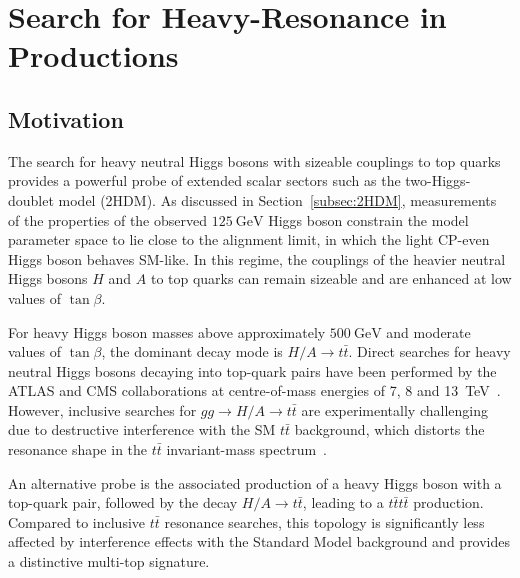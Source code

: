 ﻿%

\chapter{Search for Heavy-Resonance in \tttthead{} Productions}
\label{chap:BSMtttt}


\section{Motivation}

The search for heavy neutral Higgs bosons with sizeable couplings to
top quarks provides a powerful probe of extended scalar sectors
such as the two-Higgs-doublet model (2HDM). As discussed in
Section~\ref{subsec:2HDM}, measurements of the properties of the
observed $125~\mathrm{GeV}$ Higgs boson constrain the model parameter
space to lie close to the alignment limit, in which the light
CP-even Higgs boson behaves SM-like. In this regime, the couplings of
the heavier neutral Higgs bosons $H$ and $A$ to top quarks can remain
sizeable and are enhanced at low values of $\tan\beta$.

For heavy Higgs boson masses above approximately $500~\mathrm{GeV}$ and
moderate values of $\tan\beta$, the dominant decay mode is
$H/A \rightarrow t\bar{t}$. Direct searches for heavy neutral Higgs
bosons decaying into top-quark pairs have been performed by the ATLAS
and CMS collaborations at centre-of-mass energies of 7, 8 and
13~TeV~\cite{ATLAS:2017snw,CMS:2019pzc,ATLAS:2024vxm}. However, inclusive searches for $gg \to H/A \to t\bar{t}$ are
experimentally challenging due to destructive interference with the
SM $t\bar{t}$ background, which distorts the resonance shape in the
$t\bar{t}$ invariant-mass spectrum~\cite{Gaemers:1984sj,Hajer:2015gka}.

An alternative probe is the associated production of a heavy Higgs
boson with a top-quark pair, followed by the decay $H/A \to t\bar{t}$,
leading to a $t\bar{t}t\bar{t}$ production. Compared to inclusive
$t\bar{t}$ resonance searches, this topology is significantly less
affected by interference effects with the Standard Model background
and provides a distinctive multi-top signature.

